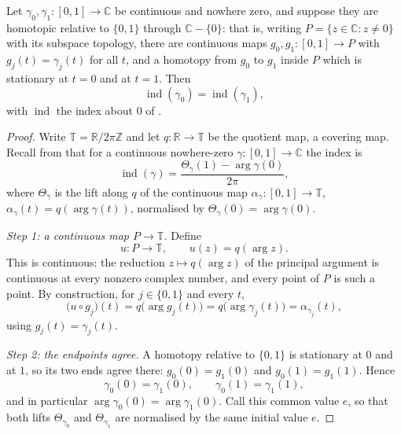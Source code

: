 \begin{lemma}
Let $\gamma_0,\gamma_1\colon[0,1]\to\mathbb{C}$ be continuous and nowhere zero,
and suppose they are homotopic relative to $\{0,1\}$ through
$\mathbb{C}-\{0\}$: that is, writing
$P=\{z\in\mathbb{C}:z\neq0\}$ with its subspace topology, there are continuous
maps $g_0,g_1\colon[0,1]\to P$ with $g_j(t)=\gamma_j(t)$ for all $t$, and a
homotopy from $g_0$ to $g_1$ inside $P$ which is stationary at $t=0$ and at
$t=1$.  Then
\[
  \operatorname{ind}(\gamma_0)=\operatorname{ind}(\gamma_1),
\]
with $\operatorname{ind}$ the index about $0$ of .
\end{lemma}
\begin{proof}
Write $\mathbb{T}=\mathbb{R}/2\pi\mathbb{Z}$ and let
$q\colon\mathbb{R}\to\mathbb{T}$ be the quotient map, a covering map.  Recall
from  that for a continuous nowhere-zero
$\gamma\colon[0,1]\to\mathbb{C}$ the index is
\begin{equation}\tag{1}
  \operatorname{ind}(\gamma)=\frac{\Theta_\gamma(1)-\arg\gamma(0)}{2\pi},
\end{equation}
where $\Theta_\gamma$ is the lift along $q$ of the continuous map
$\alpha_\gamma\colon[0,1]\to\mathbb{T}$, $\alpha_\gamma(t)=q(\arg\gamma(t))$,
normalised by $\Theta_\gamma(0)=\arg\gamma(0)$.

\emph{Step 1: a continuous map $P\to\mathbb{T}$.}  Define
\[
  u\colon P\to\mathbb{T},\qquad u(z)=q(\arg z).
\]
This is continuous: the reduction $z\mapsto q(\arg z)$ of the principal
argument is continuous at every nonzero complex number, and every point of $P$
is such a point.  By construction, for $j\in\{0,1\}$ and every $t$,
\begin{equation}\tag{2}
  \bigl(u\circ g_j\bigr)(t)=q\bigl(\arg g_j(t)\bigr)=q\bigl(\arg\gamma_j(t)\bigr)
  =\alpha_{\gamma_j}(t),
\end{equation}
using $g_j(t)=\gamma_j(t)$.

\emph{Step 2: the endpoints agree.}  A homotopy relative to $\{0,1\}$ is
stationary at $0$ and at $1$, so its two ends agree there:
$g_0(0)=g_1(0)$ and $g_0(1)=g_1(1)$.  Hence
\begin{equation}\tag{3}
  \gamma_0(0)=\gamma_1(0),\qquad \gamma_0(1)=\gamma_1(1),
\end{equation}
and in particular $\arg\gamma_0(0)=\arg\gamma_1(0)$.  Call this common value
$e$, so that both lifts $\Theta_{\gamma_0}$ and $\Theta_{\gamma_1}$ are
normalised by the same initial value $e$.


\end{proof}
